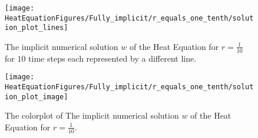 \begin{example}
\begin{figure}[H]
  \caption{The implicit numerical solution $w$ of the Heat Equation for $r=\frac{1}{10}$ for $10$ time steps each represented by a different line.}
  \centering
    \texttt{[image: HeatEquationFigures/Fully\_implicit/r\_equals\_one\_tenth/solution\_plot\_lines]}
\end{figure}


\begin{figure}[H]
  \caption{The colorplot of The implicit numerical solution $w$ of the Heat Equation for $r=\frac{1}{10}$.}
  \centering
    \texttt{[image: HeatEquationFigures/Fully\_implicit/r\_equals\_one\_tenth/solution\_plot\_image]}
\end{figure}
\end{example}

